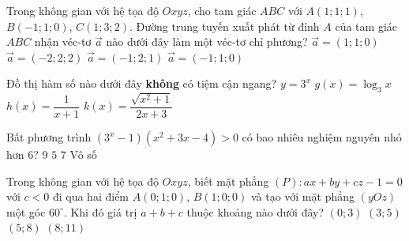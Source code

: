 \begin{ex}%
Trong không gian với hệ tọa độ $Oxyz$, cho tam giác $ABC$ với $A(1;1;1)$, $B(-1;1;0)$, $C(1;3;2)$. Đường trung tuyến xuất phát từ đỉnh $A$ của tam giác $ABC$ nhận véc-tơ $\overrightarrow{a}$ nào dưới đây làm một véc-tơ chỉ phương?
\choice
{$\overrightarrow{a}=(1;1;0)$}
{$\overrightarrow{a}=(-2;2;2)$}
{$\overrightarrow{a}=(-1;2;1)$}
{\True $\overrightarrow{a}=(-1;1;0)$}
\end{ex}

\begin{ex}%
Đồ thị hàm số nào dưới đây \textbf{không} có tiệm cận ngang?
\choice
{$y=3^x$}
{\True $g(x)=\log_3x$}
{$h(x)=\dfrac{1}{x+1}$}
{$k(x)=\dfrac{\sqrt{x^2+1}}{2x+3}$}
\end{ex}

\begin{ex}%
Bất phương trình $(3^x-1)(x^2+3x-4)>0$ có bao nhiêu nghiệm nguyên nhỏ hơn $6$?
\choice
{$9$}
{$5$}
{$7$}
{\True Vô số}
\end{ex}


\begin{ex}%
Trong không gian với hệ tọa độ $Oxyz$, biết mặt phẳng $(P):ax+by+cz-1=0$ với $c<0$ đi qua hai điểm $A(0;1;0)$, $B(1;0;0)$ và tạo với mặt phẳng $(yOz)$ một góc $60^\circ$. Khi đó giá trị $a+b+c$ thuộc khoảng nào dưới đây?
\choice
{\True $(0;3)$}
{$(3;5)$}
{$(5;8)$}
{$(8;11)$}
\end{ex}


